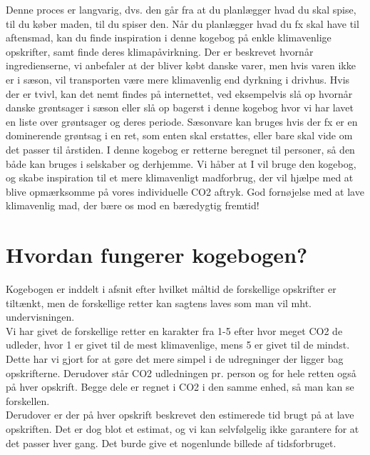 \documentclass[11pt, a4paper]{article}
\begin{document}
Denne proces er langvarig, dvs. den går fra at du planlægger hvad du skal spise, til du køber maden, til du spiser den. Når du planlægger hvad du fx skal have til aftensmad, kan du finde inspiration i denne kogebog på enkle klimavenlige opskrifter, samt finde deres klimapåvirkning. Der er beskrevet hvornår ingredienserne, vi anbefaler at der bliver købt danske varer, men hvis varen ikke er i sæson, vil transporten være mere klimavenlig end dyrkning i drivhus. Hvis der er tvivl, kan det nemt findes på internettet, ved eksempelvis slå op hvornår danske grøntsager i sæson eller slå op bagerst i denne kogebog hvor vi har lavet en liste over grøntsager og deres periode. Sæsonvare kan bruges hvis der fx er en dominerende grøntsag i en ret, som enten skal erstattes, eller bare skal vide om det passer til årstiden.
I denne kogebog er retterne beregnet til \ruNumPersons{} personer, så den både kan bruges i selskaber og derhjemme. Vi håber at I vil bruge den kogebog, og skabe inspiration til et mere klimavenligt madforbrug, der vil hjælpe med at blive opmærksomme på vores individuelle CO2 aftryk. 
God fornøjelse med at lave klimavenlig mad, der bære os mod en bæredygtig fremtid!\\



\newpage
\thispagestyle{empty}
\section*{Hvordan fungerer kogebogen?}

Kogebogen er inddelt i afsnit efter hvilket måltid de forskellige opskrifter er tiltænkt, men de forskellige retter kan sagtens laves som man vil mht. undervisningen.\\

Vi har givet de forskellige retter en karakter fra 1-5 efter hvor meget CO2 de udleder, hvor 1 er givet til de mest klimavenlige, mens 5 er givet til de mindst. Dette har vi gjort for at gøre det mere simpel i de udregninger der ligger bag opskrifterne. Derudover står CO2 udledningen pr. person og for hele retten også på hver opskrift. Begge dele er regnet i CO2 i den samme enhed, så man kan se forskellen.\\

Derudover er der på hver opskrift beskrevet den estimerede tid brugt på at lave opskriften. Det er dog blot et estimat, og vi kan selvfølgelig ikke garantere for at det passer hver gang. Det burde give et nogenlunde billede af tidsforbruget.\\
\end{document}
